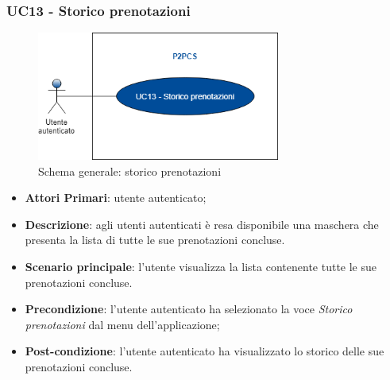 \subsubsection{UC13 - Storico prenotazioni}
 \begin{figure}[h]
	\includegraphics[width=8cm]{res/images/Schemagenerale4.png}
	\centering
	\caption{Schema generale: storico prenotazioni}
\end{figure}
\begin{itemize}
	\item \textbf{Attori Primari}: utente autenticato;
	\item \textbf{Descrizione}: agli utenti autenticati è resa disponibile una maschera che presenta la lista di tutte le sue prenotazioni concluse. 
	\item \textbf{Scenario principale}: l'utente visualizza la lista contenente tutte le sue prenotazioni concluse.
	\item \textbf{Precondizione}: l'utente autenticato ha selezionato la voce \textit{Storico prenotazioni} dal menu dell'applicazione;
	\item \textbf{Post-condizione}: l'utente autenticato ha visualizzato lo storico delle sue prenotazioni concluse. 
\end{itemize} 
